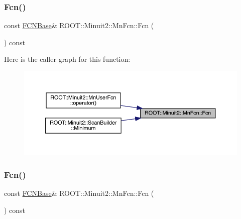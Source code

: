 \subsubsection{\texorpdfstring{Fcn()}{Fcn()}\hspace{0.1cm}{\footnotesize\ttfamily [1/2]}}
{\footnotesize\ttfamily const \mbox{\hyperlink{classROOT_1_1Minuit2_1_1FCNBase}{F\+C\+N\+Base}}\& R\+O\+O\+T\+::\+Minuit2\+::\+Mn\+Fcn\+::\+Fcn (\begin{DoxyParamCaption}{ }\end{DoxyParamCaption}) const\hspace{0.3cm}{\ttfamily [inline]}}

Here is the caller graph for this function\+:\nopagebreak
\begin{figure}[H]
\begin{center}
\leavevmode
\includegraphics[width=350pt]{de/d0e/classROOT_1_1Minuit2_1_1MnFcn_a667fd993a6bb4832e6e70b7eaaca9fa4_icgraph}
\end{center}
\end{figure}
\mbox{\label{classROOT_1_1Minuit2_1_1MnFcn_a667fd993a6bb4832e6e70b7eaaca9fa4}} 
\subsubsection{\texorpdfstring{Fcn()}{Fcn()}\hspace{0.1cm}{\footnotesize\ttfamily [2/2]}}
{\footnotesize\ttfamily const \mbox{\hyperlink{classROOT_1_1Minuit2_1_1FCNBase}{F\+C\+N\+Base}}\& R\+O\+O\+T\+::\+Minuit2\+::\+Mn\+Fcn\+::\+Fcn (\begin{DoxyParamCaption}{ }\end{DoxyParamCaption}) const\hspace{0.3cm}{\ttfamily [inline]}}

\mbox{\label{classROOT_1_1Minuit2_1_1MnFcn_af8dc896f10dc8a53429260198cd0e1c5}} 
